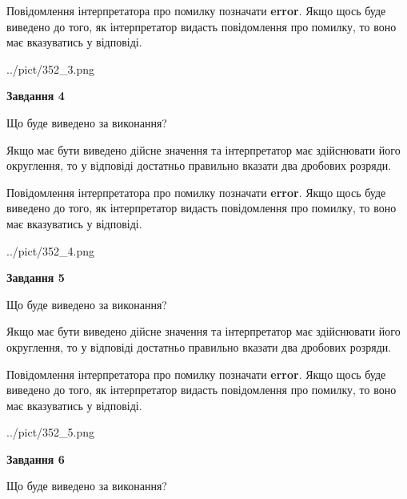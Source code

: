 \documentclass[12pt, ukrainian]{article}
\begin{document}
{\begin {Large}
Повідомлення інтерпретатора про помилку позначати \textbf{error}.
Якщо щось буде виведено до того, як інтерпретатор видасть повідомлення про помилку, 
то воно має вказуватись у відповіді. \par

\begin{center}
	{../pict/352_3.png}
\end{center}
\newpage

{\begin {center}\textbf{Завдання 4}\end {center}}\par
Що буде виведено за виконання? \par

Якщо має бути виведено дійсне значення та інтерпретатор має здійснювати його округлення, 
то у відповіді достатньо правильно вказати два дробових розряди.

Повідомлення інтерпретатора про помилку позначати \textbf{error}.
Якщо щось буде виведено до того, як інтерпретатор видасть повідомлення про помилку, 
то воно має вказуватись у відповіді. \par

\begin{center}
	{../pict/352_4.png}
\end{center}
\newpage

{\begin {center}\textbf{Завдання 5}\end {center}}\par
Що буде виведено за виконання? \par

Якщо має бути виведено дійсне значення та інтерпретатор має здійснювати його округлення, 
то у відповіді достатньо правильно вказати два дробових розряди.

Повідомлення інтерпретатора про помилку позначати \textbf{error}.
Якщо щось буде виведено до того, як інтерпретатор видасть повідомлення про помилку, 
то воно має вказуватись у відповіді. \par

\begin{center}
	{../pict/352_5.png}
\end{center}
\newpage

{\begin {center}\textbf{Завдання 6}\end {center}}\par
Що буде виведено за виконання? \par


\end{Large}}
\end{document}
